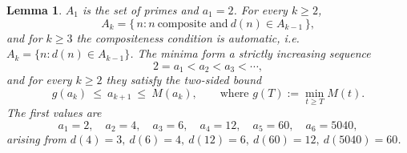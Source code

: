\documentclass{amsart}
\newtheorem{lemma}{Lemma}
\theoremstyle{definition}
\begin{document}
\begin{lemma}\label{lem:threshold}
$A_1$ is the set of primes and $a_1=2$. For every $k\ge 2$,
\begin{equation}\label{eq:Akdesc}
A_k=\{\,n: n\ \text{composite and}\ d(n)\in A_{k-1}\,\},
\end{equation}
and for $k\ge 3$ the compositeness condition is automatic, i.e.\
$A_k=\{n:d(n)\in A_{k-1}\}$. The minima form a strictly increasing sequence
\begin{equation}\label{eq:amono}
2=a_1<a_2<a_3<\cdots,
\end{equation}
and for every $k\ge 2$ they satisfy the two-sided bound
\begin{equation}\label{eq:akbounds}
g(a_k)\ \le\ a_{k+1}\ \le\ M(a_k),
\qquad\text{where } g(T):=\min_{t\ge T} M(t).
\end{equation}
The first values are
\[
a_1=2,\quad a_2=4,\quad a_3=6,\quad a_4=12,\quad a_5=60,\quad a_6=5040 ,
\]
arising from $d(4)=3,\ d(6)=4,\ d(12)=6,\ d(60)=12,\ d(5040)=60$.
\end{lemma}
\end{document}
